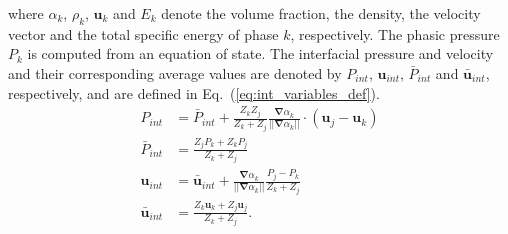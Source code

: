\documentclass[preprint,10pt]{elsarticle}
\renewcommand{\div}{\mbold{\nabla}\! \cdot \!}
\newcommand{\grad}{\mbold{\nabla}}
\newcommand{\mbold}[1]{\boldsymbol#1}
\newcommand{\eqt}[1]{Eq.~(\ref{#1})}                     %
\begin{document}
%
where $\alpha_k$, $\rho_k$, $\mbold u_k$ and $E_k$ denote the volume fraction, the density, the velocity vector and the total specific energy of phase $k$, respectively. The phasic pressure $P_k$ is computed from an equation of state. The interfacial pressure and velocity and their corresponding average values are denoted by $P_{int}$, $\mbold u_{int}$, $\bar{P}_{int}$ and $\bar{\mbold u}_{int}$, respectively, and are defined in \eqt{eq:int_variables_def}. 
%
\begin{subequations}
\label{eq:int_variables_def}
\begin{align}
  \label{E-R:83}
  P_{int} &= \bar{P}_{int} + \frac{Z_{k}Z_{j}}{Z_{k}+Z_{j}} \frac{\grad \alpha_{k}}{|| \grad \alpha_{k} ||} \cdot (\mbold u_{j}-\mbold u_{k})
  \\
  \bar{P}_{int} &= \frac{Z_{j}P_{k}+Z_{k}P_{j}}{Z_{k}+Z_{j}}
 \\
  \label{E-R:84}
  \mbold u_{int} &= \bar{\mbold u}_{int} +  \frac{\grad \alpha_{k}}{|| \grad \alpha_{k} ||} \frac{P_{j}-P_{k}}{Z_{k}+Z_{j}}
  \\
  \bar{\mbold u}_{int} &= \frac{Z_{k} \mbold u_{k}+Z_{j}\mbold u_{j}}{Z_{k}+Z_{j}}.
\end{align}
\end{subequations}
\end{document}

